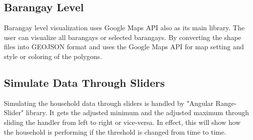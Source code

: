 \subsection{Barangay Level}
Barangay level visualization uses Google Maps API also as its main library. The user can visualize all barangays or selected barangays. By converting the shape files into GEOJSON format and uses the Google Maps API for map setting and style or coloring of the polygons. 

\subsection{Simulate Data Through Sliders}
Simulating the household data through sliders is handled by "Angular Range-Slider" library. It gets the adjusted minimum and the adjusted maximum through sliding the handler from left to right or vice-versa. In effect, this will show how the household is performing if the threshold is changed from time to time.

\clearpage